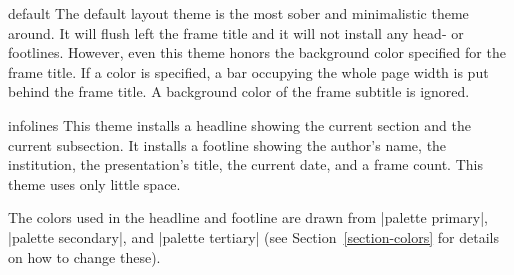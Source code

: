 \begin{outerthemeexample}{default}
  The default layout theme is the most sober and minimalistic theme around. It will flush left the frame title and it will not install any head- or footlines. However, even this theme honors the background color specified for the frame title. If a color is specified, a bar occupying the whole page width is put behind the frame title. A background color of the frame subtitle is ignored.
\end{outerthemeexample}

\begin{outerthemeexample}{infolines}
  This theme installs a headline showing the current section and the current subsection. It installs a footline showing the author's name, the institution, the presentation's title, the current date, and a frame count. This theme uses only little space.

  The colors used in the headline and footline are drawn from |palette primary|, |palette secondary|, and |palette tertiary| (see Section~\ref{section-colors} for details on how to change these).
\end{outerthemeexample}

